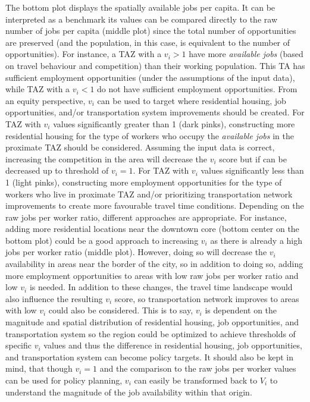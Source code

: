 \documentclass[]{elsarticle} %
\begin{document}
The bottom plot displays the spatially available jobs per capita. It can
be interpreted as a benchmark its values can be compared directly to the
raw number of jobs per capita (middle plot) since the total number of
opportunities are preserved (and the population, in this case, is
equivalent to the number of opportunities). For instance, a TAZ with a
\(v_i > 1\) have more \emph{available jobs} (based on travel behaviour
and competition) than their working population. This TA has sufficient
employment opportunities (under the assumptions of the input data),
while TAZ with a \(v_i < 1\) do not have sufficient employment
opportunities. From an equity perspective, \(v_i\) can be used to target
where residential housing, job opportunities, and/or transportation
system improvements should be created. For TAZ with \(v_i\) values
significantly greater than 1 (dark pinks), constructing more residential
housing for the type of workers who occupy the \emph{available jobs} in
the proximate TAZ should be considered. Assuming the input data is
correct, increasing the competition in the area will decrease the
\(v_i\) score but if can be decreased up to threshold of \(v_i = 1\).
For TAZ with \(v_i\) values significantly less than 1 (light pinks),
constructing more employment opportunities for the type of workers who
live in proximate TAZ and/or prioritizing transportation network
improvements to create more favourable travel time conditions. Depending
on the raw jobs per worker ratio, different approaches are appropriate.
For instance, adding more residential locations near the downtown core
(bottom center on the bottom plot) could be a good approach to
increasing \(v_i\) as there is already a high jobs per worker ratio
(middle plot). However, doing so will decrease the \(v_i\) availability
in areas near the border of the city, so in addition to doing so, adding
more employment opportunities to areas with low raw jobs per worker
ratio and low \(v_i\) is needed. In addition to these changes, the
travel time landscape would also influence the resulting \(v_i\) score,
so transportation network improves to areas with low \(v_i\) could also
be considered. This is to say, \(v_i\) is dependent on the magnitude and
spatial distribution of residential housing, job opportunities, and
transportation system so the region could be optimized to achieve
thresholds of specific \(v_i\) values and thus the difference in
residential housing, job opportunities, and transportation system can
become policy targets. It should also be kept in mind, that though
\(v_i = 1\) and the comparison to the raw jobs per worker values can be
used for policy planning, \(v_i\) can easily be transformed back to
\(V_i\) to understand the magnitude of the job availability within that
origin.
\end{document}
